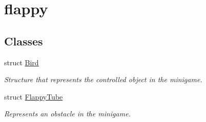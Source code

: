 \hypertarget{group__flappy}{}\section{flappy}
\label{group__flappy}
\subsection*{Classes}
\begin{DoxyCompactItemize}
\item 
struct \mbox{\hyperlink{struct_bird}{Bird}}
\begin{DoxyCompactList}\small\item\em Structure that represents the controlled object in the minigame. \end{DoxyCompactList}\item 
struct \mbox{\hyperlink{struct_flappy_tube}{Flappy\+Tube}}
\begin{DoxyCompactList}\small\item\em Represents an obstacle in the minigame. \end{DoxyCompactList}\end{DoxyCompactItemize}
